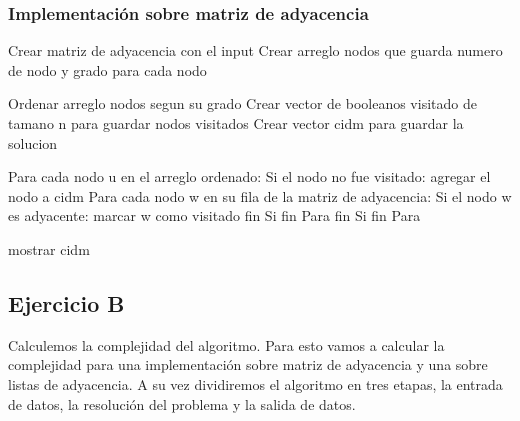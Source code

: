\subsubsection{Implementación sobre matriz de adyacencia}
\begin{codesnippet}
Crear matriz de adyacencia con el input
Crear arreglo nodos que guarda numero de nodo y grado para cada nodo

Ordenar arreglo nodos segun su grado
Crear vector de booleanos visitado de tamano n para guardar nodos visitados
Crear vector cidm para guardar la solucion

Para cada nodo u en el arreglo ordenado:
	Si el nodo no fue visitado:
		agregar el nodo a cidm
		Para cada nodo w en su fila de la matriz de adyacencia:
			Si el nodo w es adyacente:
				marcar w como visitado
			fin Si	
		fin Para
	fin Si
fin Para

mostrar cidm			
\end{codesnippet}



\subsection{Ejercicio B}
Calculemos la complejidad del algoritmo. Para esto vamos a calcular la complejidad para una implementación sobre matriz de adyacencia y una sobre listas de adyacencia. A su vez dividiremos el algoritmo en tres etapas, la entrada de datos, la resolución del problema y la salida de datos. \\ 



